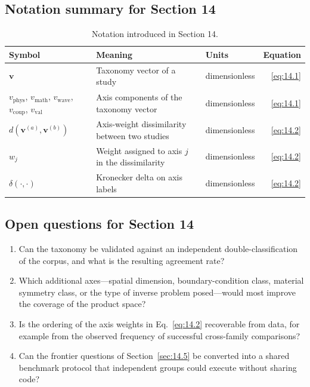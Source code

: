 \subsection{Notation summary for Section 14}

\begin{table}[h]
\centering
\small
\caption{Notation introduced in Section 14.}
\label{tab:notation-sec14}
\begin{tabularx}{\textwidth}{@{}lXlr@{}}
\toprule
\textbf{Symbol} & \textbf{Meaning} & \textbf{Units} & \textbf{Equation} \\
\midrule
$\bm{v}$ & Taxonomy vector of a study & dimensionless & \eqref{eq:14.1} \\
$v_{\text{phys}}$, $v_{\text{math}}$, $v_{\text{wave}}$, $v_{\text{coup}}$, $v_{\text{val}}$ & Axis components of the taxonomy vector & dimensionless & \eqref{eq:14.1} \\
$d(\bm{v}^{(a)},\bm{v}^{(b)})$ & Axis-weight dissimilarity between two studies & dimensionless & \eqref{eq:14.2} \\
$w_j$ & Weight assigned to axis $j$ in the dissimilarity & dimensionless & \eqref{eq:14.2} \\
$\delta(\cdot,\cdot)$ & Kronecker delta on axis labels & dimensionless & \eqref{eq:14.2} \\
\bottomrule
\end{tabularx}
\end{table}

\subsection{Open questions for Section 14}

\begin{enumerate}[label=\textbf{OQ14.\arabic*}]
\item Can the taxonomy be validated against an independent double-classification of the corpus, and what is the resulting agreement rate? \label{oq:14.1}
\item Which additional axes---spatial dimension, boundary-condition class, material symmetry class, or the type of inverse problem posed---would most improve the coverage of the product space? \label{oq:14.2}
\item Is the ordering of the axis weights in Eq.~\eqref{eq:14.2} recoverable from data, for example from the observed frequency of successful cross-family comparisons?
\item Can the frontier questions of Section~\ref{sec:14.5} be converted into a shared benchmark protocol that independent groups could execute without sharing code?
\end{enumerate}

